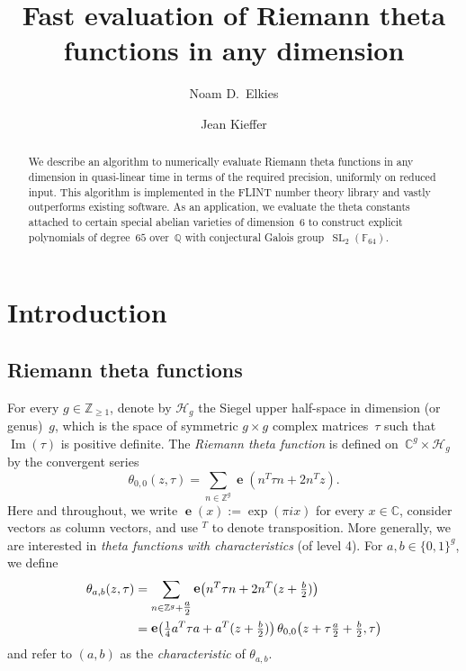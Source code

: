 \documentclass[12pt,oneside]{amsart}
\title{Fast evaluation of Riemann theta functions in any dimension}
\author{Noam D.~Elkies}
\author{Jean Kieffer}
\numberwithin{equation}{section}
\theoremstyle{definition}
\newcommand{\Z}{\mathbb{Z}}
\newcommand{\Q}{\mathbb{Q}}
\newcommand{\C}{\mathbb{C}}
\newcommand{\F}{\mathbb{F}}
\newcommand{\Half}{\mathcal{H}}
\DeclareMathOperator{\im}{Im}
\DeclareMathOperator{\SL}{SL}
\DeclareMathOperator{\e}{\mathbf{e}}
\DeclarePairedDelimiter{\paren}{(}{)}
\begin{document}
\begin{abstract}
  We describe an algorithm to numerically evaluate Riemann theta functions in
  any dimension in quasi-linear time in terms of the required precision,
  uniformly on reduced input. This algorithm is implemented in the FLINT number
  theory library and vastly outperforms existing software. As an application,
  we evaluate the theta constants attached to certain special abelian varieties
  of dimension~$6$ to construct explicit polynomials of degree~$65$ over~$\Q$
  with conjectural Galois group~$\SL_2(\F_{64})$.
\end{abstract}

\maketitle

\section{Introduction}
\label{sec:intro}

\subsection{Riemann theta functions}
\label{subsec:overview}

For every $g\in \Z_{\geq 1}$, denote by $\Half_g$ the Siegel upper half-space
in dimension (or genus)~$g$, which is the space of symmetric $g\times g$
complex matrices~$\tau$ such that $\im(\tau)$ is positive definite. The
\emph{Riemann theta function} is defined on~$\C^g\times \Half_g$ by the
convergent series
\begin{equation}
  \label{eq:theta-00}
  \theta_{0,0}(z,\tau) = \sum_{n\in \Z^g} \e(n^T\tau n + 2n^T z).
\end{equation}
Here and throughout, we write $\e(x) := \exp(\pi i x)$ for every $x\in \C$,
consider vectors as column vectors, and use $^T$ to denote transposition. More
generally, we are interested in \emph{theta functions with characteristics} (of
level 4). For $a,b \in\{0,1\}^g$, we define
\begin{equation}
  \label{eq:theta-ab}
  \begin{aligned}
    \theta_{a,b}(z,\tau)
    &= \sum_{n\in \Z^g + \tfrac a2} \e\paren[\big]{n^T\tau n + 2 n^T (z + \tfrac b2)}\\
    &= \e\paren[\big]{\tfrac14 a^T\tau a + a^T (z + \tfrac b2)}
      \,\theta_{0,0}\paren[\big]{z + \tau\tfrac a2 + \tfrac b2, \tau}
  \end{aligned}
\end{equation}
and refer to $(a,b)$ as the \emph{characteristic} of $\theta_{a,b}$.
\end{document}
